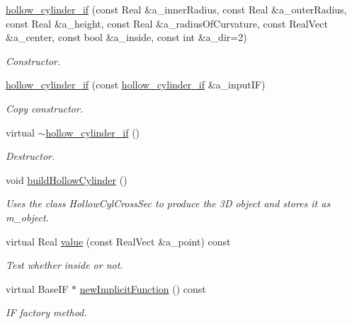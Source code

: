 \begin{DoxyCompactItemize}
\item 
\hyperlink{classhollow__cylinder__if_a2b8f1fc973e7dcce8f92789f28e91fa8}{hollow\+\_\+cylinder\+\_\+if} (const Real \&a\+\_\+inner\+Radius, const Real \&a\+\_\+outer\+Radius, const Real \&a\+\_\+height, const Real \&a\+\_\+radius\+Of\+Curvature, const Real\+Vect \&a\+\_\+center, const bool \&a\+\_\+inside, const int \&a\+\_\+dir=2)
\begin{DoxyCompactList}\small\item\em Constructor. \end{DoxyCompactList}\item 
\hyperlink{classhollow__cylinder__if_a3b6acc8cac1e83344a636127bb3cb193}{hollow\+\_\+cylinder\+\_\+if} (const \hyperlink{classhollow__cylinder__if}{hollow\+\_\+cylinder\+\_\+if} \&a\+\_\+input\+IF)
\begin{DoxyCompactList}\small\item\em Copy constructor. \end{DoxyCompactList}\item 
virtual \hyperlink{classhollow__cylinder__if_ab3978246523b3b525b248fbb91c54d91}{$\sim$hollow\+\_\+cylinder\+\_\+if} ()
\begin{DoxyCompactList}\small\item\em Destructor. \end{DoxyCompactList}\item 
void \hyperlink{classhollow__cylinder__if_a6ca494d89eddb7e3571bbecf2ebbc2d0}{build\+Hollow\+Cylinder} ()
\begin{DoxyCompactList}\small\item\em Uses the class Hollow\+Cyl\+Cross\+Sec to produce the 3D object and stores it as m\+\_\+object. \end{DoxyCompactList}\item 
virtual Real \hyperlink{classhollow__cylinder__if_a85fa3c474db91e02f6442fd41266b2df}{value} (const Real\+Vect \&a\+\_\+point) const 
\begin{DoxyCompactList}\small\item\em Test whether inside or not. \end{DoxyCompactList}\item 
virtual Base\+IF $\ast$ \hyperlink{classhollow__cylinder__if_ac9f0fe2e898391ff82aa3d38113665fa}{new\+Implicit\+Function} () const 
\begin{DoxyCompactList}\small\item\em IF factory method. \end{DoxyCompactList}\end{DoxyCompactItemize}
